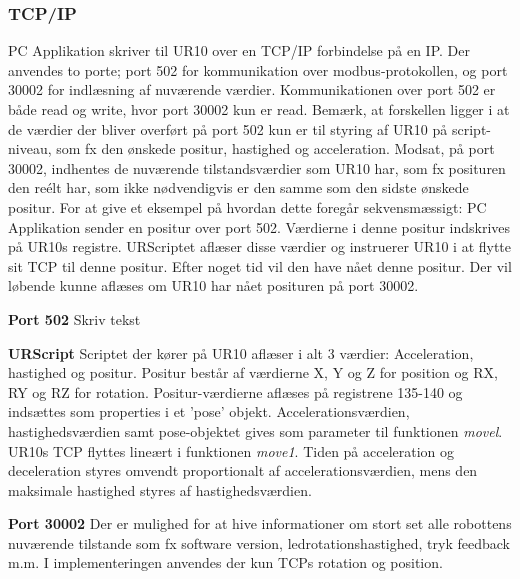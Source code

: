 \subsubsection{TCP/IP}
PC Applikation skriver til UR10 over en TCP/IP forbindelse på en IP. Der anvendes to porte; port 502 for kommunikation over modbus-protokollen, og port 30002 for indlæsning af nuværende værdier.
Kommunikationen over port 502 er både read og write, hvor port 30002 kun er read. 
Bemærk, at forskellen  ligger i at de værdier der bliver overført på port 502 kun er til styring af UR10 på script-niveau, som fx den ønskede positur, hastighed og acceleration. Modsat, på port 30002, indhentes de nuværende tilstandsværdier som UR10 har, som fx posituren den reélt har, som ikke nødvendigvis er den samme som den sidste ønskede positur.
For at give et eksempel på hvordan dette foregår sekvensmæssigt:
PC Applikation sender en positur over port 502. Værdierne i denne positur indskrives på UR10s registre.
URScriptet aflæser disse værdier og instruerer UR10 i at flytte sit TCP til denne positur.
Efter noget tid vil den have nået denne positur. Der vil løbende kunne aflæses om UR10 har nået posituren på port 30002.

\textbf{Port 502}
Skriv tekst

\textbf{URScript}
Scriptet der kører på UR10 aflæser i alt 3 værdier:
Acceleration, hastighed og positur.
Positur består af værdierne X, Y og Z for position og RX, RY og RZ for rotation.
Positur-værdierne aflæses på registrene 135-140 og indsættes som properties i et 'pose' objekt.
Accelerationsværdien, hastighedsværdien samt pose-objektet gives som parameter til funktionen \textit{movel}.
UR10s TCP flyttes lineært i funktionen \textit{move1}. Tiden på acceleration og deceleration styres omvendt proportionalt af accelerationsværdien, mens den maksimale hastighed styres af hastighedsværdien.

\textbf{Port 30002}
Der er mulighed for at hive informationer om stort set alle robottens nuværende tilstande som fx software version, ledrotationshastighed, tryk feedback m.m. I implementeringen anvendes der kun TCPs rotation og position.

